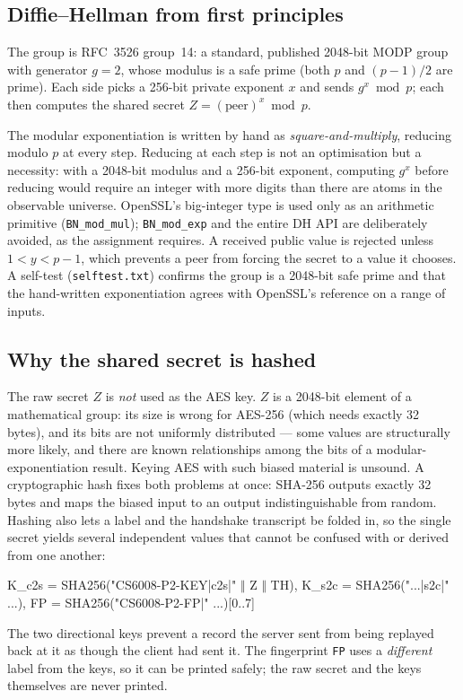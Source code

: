 \documentclass[11pt,a4paper]{article}
\begin{document}
\subsection{Diffie--Hellman from first principles}

The group is RFC~3526 group~14: a standard, published 2048-bit MODP group with generator $g = 2$,
whose modulus is a safe prime (both $p$ and $(p-1)/2$ are prime). Each side picks a 256-bit private
exponent $x$ and sends $g^{x} \bmod p$; each then computes the shared secret $Z = (\text{peer})^{x}
\bmod p$.

The modular exponentiation is written by hand as \emph{square-and-multiply}, reducing modulo $p$ at
every step. Reducing at each step is not an optimisation but a necessity: with a 2048-bit modulus and
a 256-bit exponent, computing $g^{x}$ before reducing would require an integer with more digits than
there are atoms in the observable universe. OpenSSL's big-integer type is used only as an arithmetic
primitive (\texttt{BN\_mod\_mul}); \texttt{BN\_mod\_exp} and the entire DH API are deliberately
avoided, as the assignment requires. A received public value is rejected unless $1 < y < p-1$, which
prevents a peer from forcing the secret to a value it chooses. A self-test (\texttt{selftest.txt})
confirms the group is a 2048-bit safe prime and that the hand-written exponentiation agrees with
OpenSSL's reference on a range of inputs.

\subsection{Why the shared secret is hashed}

The raw secret $Z$ is \emph{not} used as the AES key. $Z$ is a 2048-bit element of a mathematical
group: its size is wrong for AES-256 (which needs exactly 32 bytes), and its bits are not uniformly
distributed --- some values are structurally more likely, and there are known relationships among the
bits of a modular-exponentiation result. Keying AES with such biased material is unsound. A
cryptographic hash fixes both problems at once: SHA-256 outputs exactly 32 bytes and maps the biased
input to an output indistinguishable from random. Hashing also lets a label and the handshake
transcript be folded in, so the single secret yields several independent values that cannot be
confused with or derived from one another:
\begin{center}\small\ttfamily
K\_c2s = SHA256("CS6008-P2-KEY|c2s|" $\Vert$ Z $\Vert$ TH), \quad
K\_s2c = SHA256("...|s2c|" ...), \quad
FP = SHA256("CS6008-P2-FP|" ...)[0..7]
\end{center}
The two directional keys prevent a record the server sent from being replayed back at it as though the
client had sent it. The fingerprint \texttt{FP} uses a \emph{different} label from the keys, so it can
be printed safely; the raw secret and the keys themselves are never printed.
\end{document}
